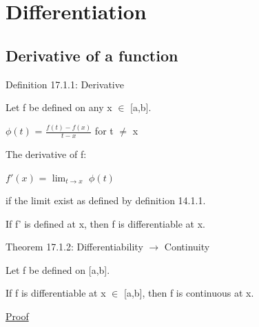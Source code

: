 \newpage

\section[Day 17: Differentiation]{Differentiation}

\subsection{ Derivative of a function }

{ \color{blue} Definition 17.1.1: Derivative }

    \begin{adjustbox}{minipage=14cm, right, vspace=0.1cm 0cm}
        Let f be defined on any x $\in$ [a,b].

        \hspace{1cm}
        $\phi(t)$ = $\frac{f(t) - f(x)}{t - x}$ for t $\not =$ x
        
        The derivative of f:

        \hspace{1cm}
        $f'(x)$ = $\lim_{t \rightarrow x}$ $\phi(t)$

        if the limit exist as defined by {\color{blue} definition 14.1.1}.

        If f' is defined at x, then f is differentiable at x.
    \end{adjustbox}

    \vspace{0.5cm}

{ \color{red} Theorem 17.1.2: Differentiability $\rightarrow$ Continuity }

    \begin{adjustbox}{minipage=14cm, right, vspace=0.1cm 0cm}
        Let f be defined on [a,b].
        
        If f is differentiable at x $\in$ [a,b], then f is continuous at x.
    \end{adjustbox}

{ \color{magenta} \underline{Proof} }


    \vspace{0.5cm}

